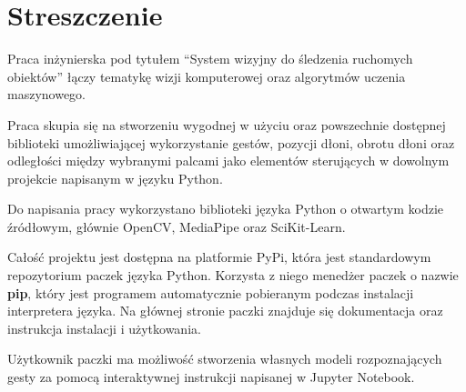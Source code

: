 \chapter{Streszczenie}


\quad Praca inżynierska pod tytułem \enquote{System wizyjny do śledzenia ruchomych obiektów} łączy tematykę wizji komputerowej oraz algorytmów uczenia maszynowego. 

\quad Praca skupia się na stworzeniu wygodnej w użyciu oraz powszechnie dostępnej biblioteki umożliwiającej wykorzystanie gestów, pozycji dłoni, obrotu dłoni oraz odległości między wybranymi palcami jako elementów sterujących w dowolnym projekcie napisanym w języku Python. 

\quad Do napisania pracy wykorzystano biblioteki języka Python o otwartym kodzie źródłowym, głównie OpenCV, MediaPipe oraz SciKit-Learn. 

\quad Całość projektu jest dostępna na platformie PyPi, która jest standardowym repozytorium paczek języka Python. Korzysta z niego menedżer paczek o nazwie \textbf{pip}, który jest programem automatycznie pobieranym podczas instalacji interpretera języka. Na głównej stronie paczki znajduje się dokumentacja oraz instrukcja instalacji i użytkowania. 

\quad Użytkownik paczki ma możliwość stworzenia własnych modeli rozpoznających gesty za pomocą interaktywnej instrukcji napisanej w Jupyter Notebook. 



\pagestyle{NumeryStronNazwyRozdzialow}






